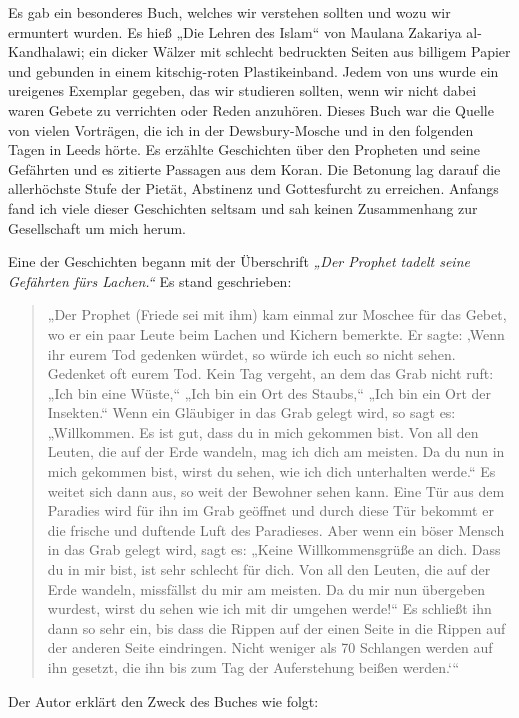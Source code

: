 \documentclass[12pt]{memoir}
\def\–{-\hskip0pt}
\begin{document}
Es gab ein besonderes Buch, welches wir verstehen sollten
und wozu wir ermuntert wurden.
Es hieß „Die Lehren des Islam“ von Maulana Zakariya al\–Kandhalawi;
ein dicker Wälzer mit schlecht bedruckten Seiten aus billigem Papier
und gebunden in einem kitschig-roten Plastikeinband.
Jedem von uns wurde ein ureigenes Exemplar gegeben, das wir studieren sollten,
wenn wir nicht dabei waren Gebete zu verrichten oder Reden anzuhören.
Dieses Buch war die Quelle von vielen Vorträgen,
die ich in der Dewsbury-Mosche und in den folgenden Tagen in Leeds hörte.
Es erzählte Geschichten über den Propheten und seine Gefährten
und es zitierte Passagen aus dem Koran.
Die Betonung lag darauf die allerhöchste Stufe der Pietät,
Abstinenz und Gottesfurcht zu erreichen.
Anfangs fand ich viele dieser Geschichten seltsam
und sah keinen Zusammenhang zur Gesellschaft um mich herum.

Eine der Geschichten begann mit der Überschrift
\emph{„Der Prophet tadelt seine Gefährten fürs Lachen.“}
Es stand geschrieben:

\begin{quote}
„Der Prophet (Friede sei mit ihm) kam einmal zur Moschee für das Gebet,
wo er ein paar Leute beim Lachen und Kichern bemerkte.
Er sagte: ‚Wenn ihr eurem Tod gedenken würdet,
so würde ich euch so nicht sehen.
Gedenket oft eurem Tod. Kein Tag vergeht, an dem das Grab nicht ruft:
„Ich bin eine Wüste,“ „Ich bin ein Ort des Staubs,“
„Ich bin ein Ort der Insekten.“
Wenn ein Gläubiger in das Grab gelegt wird, so sagt es:
„Willkommen. Es ist gut, dass du in mich gekommen bist.
Von all den Leuten, die auf der Erde wandeln, mag ich dich am meisten.
Da du nun in mich gekommen bist, wirst du sehen,
wie ich dich unterhalten werde.“
Es weitet sich dann aus, so weit der Bewohner sehen kann.
Eine Tür aus dem Paradies wird für ihn im Grab geöffnet
und durch diese Tür bekommt er die frische und duftende Luft des Paradieses.
Aber wenn ein böser Mensch in das Grab gelegt wird, sagt es:
„Keine Willkommensgrüße an dich. Dass du in mir bist,
ist sehr schlecht für dich. Von all den Leuten, die auf der Erde wandeln,
missfällst du mir am meisten.
Da du mir nun übergeben wurdest,
wirst du sehen wie ich mit dir umgehen werde!“
Es schließt ihn dann so sehr ein,
bis dass die Rippen auf der einen Seite
in die Rippen auf der anderen Seite eindringen.
Nicht weniger als 70 Schlangen werden auf ihn gesetzt,
die ihn bis zum Tag der Auferstehung beißen werden.‘“
\end{quote}

Der Autor erklärt den Zweck des Buches wie folgt:
\end{document}
